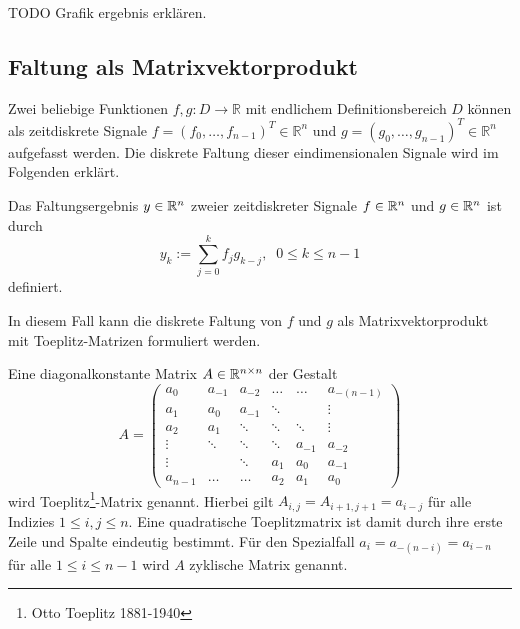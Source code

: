 TODO Grafik ergebnis erklären.

\subsection{Faltung als Matrixvektorprodukt}
\label{abs:conv_using_sparse}
Zwei beliebige Funktionen $f,g: D \rightarrow \mathbb{R}$ mit endlichem Definitionsbereich $D$ können als zeitdiskrete Signale $f=(f_0, \ldots, f_{n-1})^T \in \mathbb{R}^{n}$ und $g=(g_0, \ldots, g_{n-1})^T \in \mathbb{R}^{n}$ aufgefasst werden. %
Die diskrete Faltung dieser eindimensionalen Signale wird im Folgenden erklärt.

\begin{defi}
    Das Faltungsergebnis $y \in \mathbb{R}^{n}$ zweier zeitdiskreter Signale $f \in \mathbb{R}^n$ und $g \in \mathbb{R}^n$ ist durch
    \begin{equation}
        y_k:=\sum_{j=0}^{k} f_j g_{k-j}, \; \; 0 \leq k \leq n-1
    \end{equation}
    definiert.
\end{defi}
In diesem Fall kann die diskrete Faltung von $f$ und $g$ als Matrixvektorprodukt mit Toeplitz-Matrizen formuliert werden. 

\begin{defi}
    \label{def:toeplitzM}
    Eine diagonalkonstante Matrix $A \in \mathbb{R}^{n \times n}$ der Gestalt
    \begin{equation*}
    A=
    \begin{pmatrix}
        a_0 & a_{-1} &a_{-2} &\ldots &\ldots &a_{-(n-1)} \\ 
        a_1 & a_0 &a_{-1} &\ddots & &\vdots \\
        a_2 & a_1 &\ddots &\ddots &\ddots &\vdots\\
        \vdots & \ddots &\ddots &\ddots &a_{-1} &a_{-2}\\
        \vdots & &\ddots &a_1 &a_0 &a_{-1} \\
        a_{n-1} &\ldots &\ldots &a_{2} &a_{1} &a_0
    \end{pmatrix}
\end{equation*}
    wird Toeplitz\footnote{Otto Toeplitz 1881-1940}-Matrix genannt. Hierbei gilt $A_{i,j}=A_{i+1,j+1}=a_{i-j}$ für alle Indizies $1 \leq i, j \leq n$. Eine quadratische Toeplitzmatrix ist damit durch ihre erste Zeile und Spalte eindeutig bestimmt. Für den Spezialfall $a_i=a_{-(n-i)}=a_{i-n}$ für alle $1 \leq i \leq n-1$ wird $A$ zyklische Matrix genannt.
\end{defi}

